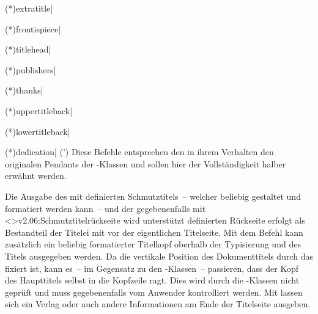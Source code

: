 \begin{DeclareEntity*}{}
\begin{DeclareEntity*}{}
\begin{DeclareEntity*}{}
\begin{Declaration}
  {\Macro(*){extratitle|}}
\begin{Declaration}
  {\Macro(*){frontispiece|}}
\begin{Declaration}
  {\Macro(*){titlehead|}}
\begin{Declaration}
  {\Macro(*){publishers|}}
\begin{Declaration}
  {\Macro(*){thanks|}}
\begin{Declaration}
  {\Macro(*){uppertitleback|}}
\begin{Declaration}
  {\Macro(*){lowertitleback|}}
\begin{Declaration}
  {\Macro(*){dedication|}}
\printdeclarationlist(\scrguide')
%
Diese Befehle entsprechen den in ihrem Verhalten den originalen Pendants der 
\KOMAScript-Klassen und sollen hier der Vollständigkeit halber erwähnt werden.

Die Ausgabe des mit  definierten Schmutztitels~-- welcher 
beliebig gestaltet und formatiert werden kann~-- und der gegebenenfalls mit 
\ChangedAt<>{v2.06:Schmutztitelrückseite wird unterstützt}%
 definierten Rückseite erfolgt als Bestandteil der Titelei 
mit  vor der eigentlichen Titelseite. Mit dem Befehl 
 kann zusätzlich ein beliebig formatierter Titelkopf oberhalb 
der Typisierung und des Titels ausgegeben werden. Da die vertikale Position des 
Dokumenttitels durch das \CD fixiert ist, kann es~-- im Gegensatz zu den 
\KOMAScript-Klassen~-- passieren, dass der Kopf des Haupttitels selbst in die 
Kopfzeile ragt. Dies wird durch die \TUDScript-Klassen nicht geprüft und muss 
gegebenenfalls vom Anwender kontrolliert werden. Mit  lassen 
sich ein Verlag oder auch andere Informationen am Ende der Titelseite ausgeben.


\end{Declaration}
\end{Declaration}
\end{Declaration}
\end{Declaration}
\end{Declaration}
\end{Declaration}
\end{Declaration}
\end{Declaration}
\end{DeclareEntity*}
\end{DeclareEntity*}
\end{DeclareEntity*}
